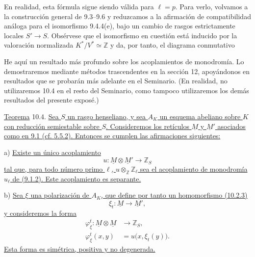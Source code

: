 
En realidad, esta fórmula sigue siendo válida para $\ell=p$. Para
verlo, volvamos a la construcción general de 9.3--9.6 y reduzcamos a
la afirmación de compatibilidad análoga para el isomorfismo 9.4.4(e),
bajo un cambio de rasgos estrictamente locales
$S'\longrightarrow S$. Obsérvese que el isomorfismo en cuestión está
inducido por la valoración normalizada $K^*/V^*\simeq\mathbb Z$ y da,
por tanto, el diagrama conmutativo
\begin{center}
\end{center}

He aquí un resultado más profundo sobre los acoplamientos de
monodromía. Lo demostraremos mediante métodos trascendentes en la
sección 12, apoyándonos en resultados que se probarán más adelante en
el Seminario. (En realidad, no utilizaremos 10.4 en el resto del
Seminario, como tampoco utilizaremos los demás resultados del presente
exposé.)

\medskip
\noindent
\underline{Teorema} 10.4. \underline{Sea $S$ un rasgo henseliano, y
sea $A_K$ un esquema abeliano sobre $K$ con reducción semiestable sobre
$S$. Consideremos los retículos $\underline M$ y $\underline M'$
asociados como en 9.1 (cf. 5.5.2). Entonces se cumplen las afirmaciones
siguientes:}


\smallskip
\noindent
a) \underline{Existe un único acoplamiento}
\begin{equation}\tag{10.4.1}
u:\underline M\otimes\underline M'\longrightarrow\mathbb Z_S
\end{equation}
\underline{tal que, para todo número primo $\ell$,
$u\otimes_{\mathbb Z}\mathbb Z_\ell$ sea el acoplamiento de monodromía
$u_\ell$ de (9.1.2). Este acoplamiento es separante.}

\smallskip
\noindent
b) \underline{Sea $\xi$ una polarización de $A_K$, que define por
tanto un homomorfismo (10.2.3)}
\begin{equation*}
\xi_t:\underline M\longrightarrow\underline M',
\end{equation*}
\underline{y consideremos la forma}
\begin{equation}\tag{10.4.2}
\begin{aligned}
\varphi_\xi^t:\underline M\otimes\underline M
  &\longrightarrow\mathbb Z_S,\\
\varphi_\xi^t(x,y)&=u\bigl(x,\xi_t(y)\bigr).
\end{aligned}
\end{equation}
\underline{Esta forma es simétrica, positiva y no degenerada.}

